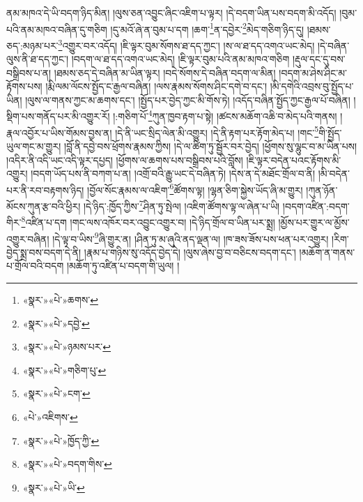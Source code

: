 ནམ་མཁའ་དེ་ཡི་བདག་ཉིད་མིན། །ལུས་ཅན་འབྱུང་ཞིང་འཇིག་པ་ལྟར། །དེ་བདག་ཡིན་པས་བདག་མི་འདོད། །བུམ་པའི་ནམ་མཁའ་བཞིན་དུ་གཅིག །དུ་མའོ་ཞེ་ན་བུམ་པ་དག །ཆག་\footnote{«སྣར་»«པེ་»ཆགས་}ན་དབྱེར་\footnote{«སྣར་»«པེ་»དབྱེ་}མེད་གཅིག་ཉིད་དུ། །ཐམས་ཅད་:མཉམ་པར་\footnote{«སྣར་»«པེ་»ཉམས་པར་}འགྱུར་བར་འདོད། །ཇི་ལྟར་བུམ་སོགས་ཐ་དད་ཀྱང་། །ས་ལ་ཐ་དད་འགའ་ཡང་མེད། །དེ་བཞིན་ལུས་ནི་ཐ་དད་ཀྱང་། །བདག་ལ་ཐ་དད་འགའ་ཡང་མེད། །ཇི་ལྟར་བུམ་པའི་ནམ་མཁའ་གཅིག །རྡུལ་དང་དུ་བས་བསྒྲིབས་པ་ན། །ཐམས་ཅད་དེ་བཞིན་མ་ཡིན་ལྟར། །བདེ་སོགས་དེ་བཞིན་བདག་ལ་མིན། །བདག་མ་ཤེས་ཤིང་མ་རྟོགས་པས། །རྨི་ལམ་ལོངས་སྤྱོད་ང་རྒྱལ་བཞིན། །ལས་རྣམས་སོགས་ཤིང་དགེ་བ་དང་། །མི་དགེའི་འབྲས་བུ་སྤྱོད་པ་ཡིན། །ལུས་ལ་གནས་ཀྱང་མ་ཆགས་དང་། །སྤྱོད་པར་བྱེད་ཀྱང་མི་གོས་ཏེ། །འདོད་བཞིན་སྤྱོད་ཀྱང་རྒྱལ་པོ་བཞིན། །སྡིག་པས་གནོད་པར་མི་འགྱུར་རོ། །:གཅིག་པོ་\footnote{«སྣར་»«པེ་»གཅིག་པུ་}ཀུན་ཁྱབ་རྟག་པ་སྟེ། །ཚངས་མཆོག་འཆི་བ་མེད་པའི་གནས། །རྣལ་འབྱོར་པ་ཡིས་གོམས་བྱས་ན། །དེ་ནི་ཡང་སྲིད་ལེན་མི་འགྱུར། །དེ་ནི་རྟག་པར་རྟོག་མེད་པ། །གང་\footnote{«སྣར་»«པེ་»ངག་}གི་སྤྱོད་ཡུལ་གང་མ་གྱུར། །བློ་ནི་དབྱེ་བས་ཕྲོགས་རྣམས་ཀྱིས། །དེ་ལ་ཚིག་ཏུ་སྦྱོར་བར་བྱེད། །ཕྱོགས་སུ་ལྷུང་བ་མ་ཡིན་པས། །འདིར་ནི་འདི་ཡང་འདི་ལྟར་དཔྱད། །ཕྱོགས་ལ་ཆགས་པས་བསྒྲིབས་པའི་བློས། །ཇི་ལྟར་བདེན་པའང་རྟོགས་མི་འགྱུར། །བདག་ཡོད་པས་ནི་བཀག་པ་ན། །འགྲོ་བའི་རྒྱུ་ཡང་དེ་བཞིན་ཏེ། །དེས་ན་དེ་མཐོང་གྲོལ་བ་ནི། །མི་བདེན་པར་ནི་རབ་བརྟགས་ཉིད། །བྱོལ་སོང་རྣམས་ལ་འཇིག་\footnote{«པེ་»འཇིགས་}ཚོགས་ལྟ། །ལྷན་ཅིག་སྐྱེས་ཡོད་ཞི་མ་གྱུར། །ཀུན་ཉོན་མོངས་ཀུན་རྩ་བའི་ཕྱིར། །དེ་ཉིད་:ཁྱོད་ཀྱིས་\footnote{«སྣར་»«པེ་»ཁྱོད་ཀྱི་}ཤིན་ཏུ་སྤེལ། །འཇིག་ཚོགས་ལྟ་ལ་ཞེན་པ་ཡི། །བདག་འཛིན་:བདག་གིར་\footnote{«སྣར་»«པེ་»བདག་གིས་}འཛིན་པ་དག །གང་ལས་འཁོར་བར་འབྱུང་འགྱུར་བ། །དེ་ཉིད་གྲོལ་བ་ཡིན་པར་སྨྲ། །མྱོས་པར་གྱུར་ལ་མྱོས་འགྱུར་བཞིན། །དེ་ལྟ་བ་ཡིས་\footnote{«སྣར་»«པེ་»ཡི་}ཞི་གྱུར་ན། །ཤིན་ཏུ་མ་ཞུའི་ནད་ལྡན་ལ། །ཁ་ཟས་ཟོས་པས་ཕན་པར་འགྱུར། །རིག་བྱེད་སྨྲ་བས་བདག་དེ་ནི། །རྣམ་པ་གཉིས་སུ་འདོད་བྱེད་དེ། །ལུས་ཞེས་བྱ་བ་བཅིངས་བདག་དང་། །མཆོག་ན་གནས་པ་གྲོལ་བའི་བདག །མཆོག་ཏུ་འཛིན་པ་བདག་གི་ཡུལ། །

